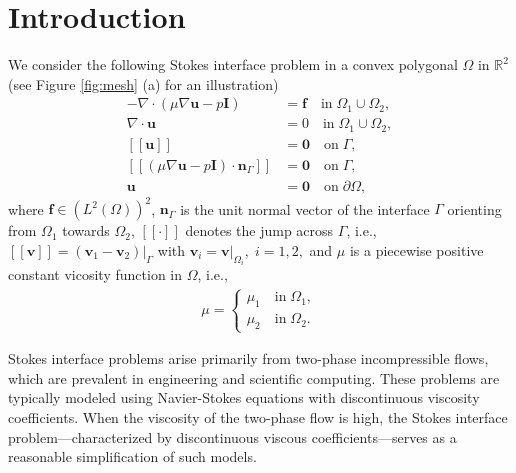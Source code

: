 \documentclass[a4paper,11pt,fleqn]{article}
\numberwithin{equation}{section}
\begin{document}
	\section{Introduction}\label{sec:introduction}
We consider the following Stokes interface problem in a convex polygonal $\Omega$ in $\mathbb{R}^2$ (see Figure \ref{fig:mesh} (a) for an illustration)
\begin{equation}
	\begin{aligned}
			-\nabla\!\cdot\!(\mu \nabla \boldsymbol{u}-p\boldsymbol{I})& = \boldsymbol{f}\quad \mathrm{in} \; \Omega_1 \cup \Omega_2,\\
			\nabla\!\cdot\!\boldsymbol{u}&=0 \quad \mathrm{in}
			\; \Omega_1 \cup \Omega_2,\\
			[\![\boldsymbol{u}]\!] &=\boldsymbol{0}\quad 
			\mathrm{on}\; \Gamma,\\
			[\![(\mu\nabla\boldsymbol{u}-p\boldsymbol{I})\!\cdot\!\boldsymbol{n}_{\Gamma}]\!]&=\boldsymbol{0}\quad \mathrm{on}\;\Gamma,\\
			\boldsymbol{u} & =\boldsymbol{0}\quad \mathrm{on}\; \partial \Omega,
	\end{aligned}\label{eq:stokespro}
\end{equation}
where $\boldsymbol{f} \in (L^2(\Omega))^2$, $\boldsymbol{n}_{\Gamma}$ is the unit normal vector of the interface $\Gamma$ orienting from $\Omega_1$ towards $\Omega_2$, $[\![\cdot]\!]$ denotes the jump across $\Gamma$, i.e., $[\![\boldsymbol{v}]\!]=(\boldsymbol{v}_1-\boldsymbol{v}_2)|_{\Gamma}$ with $\boldsymbol{v}_i = \boldsymbol{v}|_{\Omega_i},\;i=1,2,$ and $\mu$ is a piecewise positive constant vicosity function in $\Omega$, i.e., 
\begin{equation*}
		\begin{aligned}
			\mu = \begin{cases}
				\mu_1 \quad \mathrm{in}\; \Omega_1,\\	
				\mu_2 \quad  \mathrm{in} \;\Omega_2.
			\end{cases}
		\end{aligned}
\end{equation*}

Stokes interface problems arise primarily from two-phase incompressible flows, which are prevalent in engineering and scientific computing. These problems are typically modeled using Navier-Stokes equations with discontinuous viscosity coefficients. When the viscosity of the two-phase flow is high, the Stokes interface problem—characterized by discontinuous viscous coefficients—serves as a reasonable simplification of such models.
\end{document}
